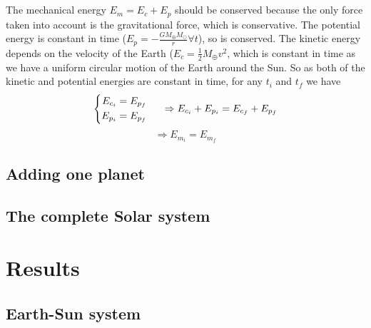 \documentclass[a4paper, twoside, 11pt]{report}
\theoremstyle{theorem}
\theoremstyle{remark}
\theoremstyle{exemple}
\begin{document}
            \paragraph{}The mechanical energy $E_m = E_c + E_p$ should be conserved because the only force taken into account is the gravitational force, which is conservative. The potential energy is constant in time ($E_p = -\frac{GM_{\oplus}M_{\odot}}{r} \forall t$), so is conserved. The kinetic energy depends on the velocity of the Earth ($E_c = \frac{1}{2}M_{\oplus}v^2$, which is constant in time as we have a uniform circular motion of the Earth around the Sun. So as both of the kinetic and potential energies are constant in time, for any $t_i$ and $t_f$ we have
                \begin{equation*}
                    \left\{
                        \begin{aligned}
                            E_{c_i} &= E_{p_f}\\
                            E_{p_i} &= E_{p_f}
                        \end{aligned}
                    \right. \hspace{0.5cm} \Rightarrow E_{c_i} + E_{p_i} = E_{c_f} + E_{p_f}
                \end{equation*} 
                \begin{equation*}
                    \Rightarrow E_{m_i} = E_{m_f}
                \end{equation*}
                        
    
    \section{Adding one planet}
    
    
    \section{The complete Solar system}
    
    

\chapter{Results}

    \section{Earth-Sun system}  
        \subsection{} 
    
\end{document}
